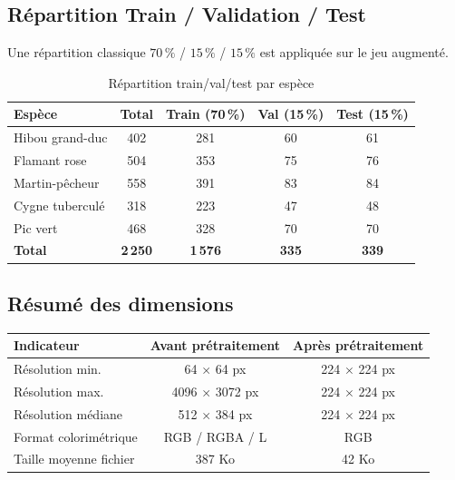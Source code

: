 \documentclass[12pt,a4paper]{article}
\begin{document}
\subsection{Répartition Train / Validation / Test}

\begin{center}

Une répartition classique $70\,\%$ / $15\,\%$ / $15\,\%$ est appliquée sur le jeu augmenté.

\begin{table}[h!]
  \centering
  \caption{Répartition train/val/test par espèce}
  \label{tab:split}
  \begin{tabular}{lcccc}
    \toprule
    \textbf{Espèce} & \textbf{Total} & \textbf{Train (70\,\%)} & \textbf{Val (15\,\%)} & \textbf{Test (15\,\%)} \\
    \midrule
    Hibou grand-duc  &  402 &  281 &  60 &  61 \\
    Flamant rose     &  504 &  353 &  75 &  76 \\
    Martin-pêcheur   &  558 &  391 &  83 &  84 \\
    Cygne tuberculé  &  318 &  223 &  47 &  48 \\
    Pic vert         &  468 &  328 &  70 &  70 \\
    \midrule
    \textbf{Total}   & \textbf{2\,250} & \textbf{1\,576} & \textbf{335} & \textbf{339} \\
    \bottomrule
  \end{tabular}
\end{table}
\end{center}

\subsection{Résumé des dimensions}

\begin{center}
\begin{tabular}{lcc}
  \toprule
  \textbf{Indicateur} & \textbf{Avant prétraitement} & \textbf{Après prétraitement} \\
  \midrule
  Résolution min.   & 64 \(\times\) 64 px      & 224 \(\times\) 224 px \\
  Résolution max.   & 4096 \(\times\) 3072 px  & 224 \(\times\) 224 px \\
  Résolution médiane & 512 \(\times\) 384 px   & 224 \(\times\) 224 px \\
  Format colorimétrique & RGB / RGBA / L       & RGB \\
  Taille moyenne fichier & 387 Ko             & 42 Ko \\
  \bottomrule
\end{tabular}
\end{center}
\end{document}
